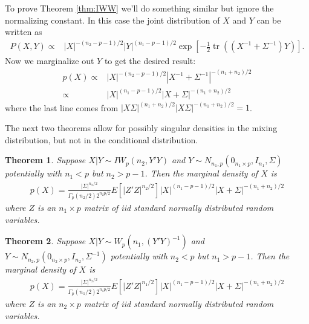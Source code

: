 \documentclass{article}\usepackage[]{graphicx}\usepackage[]{color}
\newtheorem{thm}{Theorem}[subsection]
\DeclareMathOperator{\tr}{tr}
\begin{document}
To prove Theorem \eqref{thm:IWW} we'll do something similar but ignore the normalizing constant. In this case the joint distribution of $X$ and $Y$ can be written as
\begin{align*}
  P(X,Y) \propto & |X|^{-(n_2 -p-1)/2}|Y|^{(n_1 - p-1)/2}\exp\left[-\frac{1}{2}\tr\left((X^{-1} + \Sigma^{-1})Y\right)\right].
\end{align*}
Now we marginalize out $Y$ to get the desired result:
\begin{align*}
  p(X) \propto & |X|^{-(n_2 - p-1)/2}\left|X^{-1} + \Sigma^{-1}\right|^{-(n_1 + n_2)/2} \\
  \propto & |X|^{(n_1 - p-1)/2}\left|X + \Sigma\right|^{-(n_1 + n_2)/2}
\end{align*}
where the last line comes from $|X\Sigma|^{(n_1 + n_2)/2}|X\Sigma|^{-(n_1 + n_2)/2}=1$.

The next two theorems allow for possibly singular densities in the mixing distribution, but not in the conditional distribution.
\begin{thm}\label{thm:IWWs}
  Suppose $X|Y \sim IW_p(n_2,Y'Y)$ and $Y\sim N_{n_1,p}(0_{n_1\times p}, I_{n_1}, \Sigma)$ potentially with $n_1 < p$ but $n_2 > p - 1$. Then the marginal density of $X$ is
  \begin{align*}
    p(X) = \frac{|\Sigma|^{n_2/2}}{\Gamma_p(n_2/2)2^{n_2p/2}}E[|Z'Z|^{n_2/2}]|X|^{(n_1 - p - 1)/2}|X + \Sigma|^{-(n_1 + n_2)/2}
  \end{align*}
  where $Z$ is an $n_1\times p$ matrix of iid standard normally distributed random variables.
\end{thm}

\begin{thm}\label{thm:WIWs}
  Suppose $X|Y \sim W_p(n_1,(Y'Y)^{-1})$ and $Y\sim N_{n_2,p}(0_{n_2\times p}, I_{n_2}, \Sigma^{-1})$ potentially with $n_2 < p$ but $n_1 > p - 1$. Then the marginal density of $X$ is
  \begin{align*}
    p(X) = \frac{|\Sigma|^{n_2/2}}{\Gamma_p(n_1/2)2^{n_1p/2}}E[|Z'Z|^{n_1/2}]|X|^{(n_1 - p - 1)/2}|X + \Sigma|^{-(n_1 + n_2)/2}
  \end{align*}
  where $Z$ is an $n_2\times p$ matrix of iid standard normally distributed random variables.
\end{thm}
\end{document}
